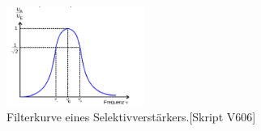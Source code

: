 \begin{figure}[H]
 \centering
 \includegraphics[width=0.4\textwidth]{../figures/glocke.png}
 \caption{Filterkurve eines Selektivverstärkers.[Skript V606]}
 \label{fig:glocke}
\end{figure}


